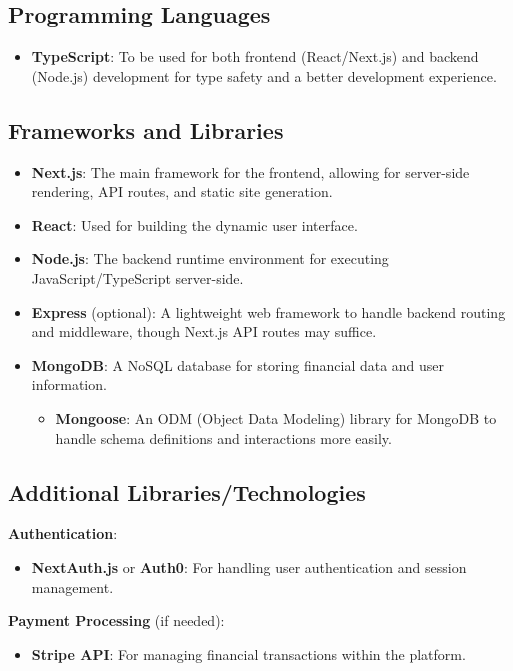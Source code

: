 \documentclass{article}
\begin{document}
\subsection{Programming Languages}
\begin{itemize}
  \item \textbf{TypeScript}: To be used for both frontend (React/Next.js) and backend (Node.js) development for type safety and a better development experience.
\end{itemize}

\subsection{Frameworks and Libraries}
\begin{itemize}
  \item \textbf{Next.js}: The main framework for the frontend, allowing for server-side rendering, API routes, and static site generation.
  \item \textbf{React}: Used for building the dynamic user interface.
  \item \textbf{Node.js}: The backend runtime environment for executing JavaScript/TypeScript server-side.
  \item \textbf{Express} (optional): A lightweight web framework to handle backend routing and middleware, though Next.js API routes may suffice.
  \item \textbf{MongoDB}: A NoSQL database for storing financial data and user information.
  \begin{itemize}
    \item \textbf{Mongoose}: An ODM (Object Data Modeling) library for MongoDB to handle schema definitions and interactions more easily.
  \end{itemize}
\end{itemize}

\subsection{Additional Libraries/Technologies}
\textbf{Authentication}:
\begin{itemize}
  \item \textbf{NextAuth.js} or \textbf{Auth0}: For handling user authentication and session management.
\end{itemize}

\textbf{Payment Processing} (if needed):
\begin{itemize}
  \item \textbf{Stripe API}: For managing financial transactions within the platform.
\end{itemize}
\end{document}
